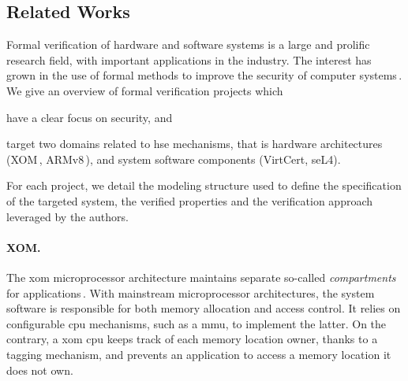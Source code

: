 %


\subsection{Related Works}

Formal verification of hardware and software systems is a large and prolific
research field, with important applications in the industry.
%
The interest has grown in the use of formal methods to improve the security of
computer systems\,\cite{chong2016report}.
%
We give an overview of formal verification projects which
%
\begin{inparaenum}[(1)]
\item have a clear focus on security, and
\item target two domains related to \ac{hse} mechanisms, that is hardware
  architectures (XOM\,\cite{lie2003xom}, ARMv8\,\cite{reid2016armv8}), and
  system software components (VirtCert, seL4).
\end{inparaenum}
%
For each project, we detail the modeling structure used to define the
specification of the targeted system, the verified properties and the
verification approach leveraged by the authors.

\paragraph{XOM.}
%
The \ac{xom} microprocessor architecture maintains separate so-called
\emph{compartments} for applications\,.
%
With mainstream microprocessor architectures, the system software is responsible
for both memory allocation and access control.
%
It relies on configurable \ac{cpu} mechanisms, such as a \ac{mmu}, to implement
the latter.
%
On the contrary, a \ac{xom} \ac{cpu} keeps track of each memory location owner,
thanks to a tagging mechanism, and prevents an application to access a memory
location it does not own.

